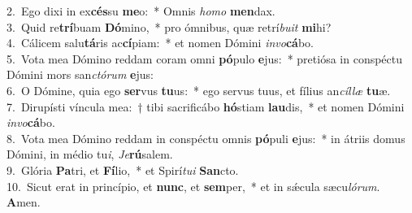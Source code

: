 {2.~}Ego dixi in ex\textbf{cés}su \textbf{me}o:~* Omnis \textit{ho}\textit{mo} \textbf{men}dax.\\
{3.~}Quid re\textbf{trí}buam \textbf{Dó}mino,~* pro ómnibus, quæ retrí\textit{bu}\textit{it} \textbf{mi}hi?\\
{4.~}Cálicem salu\textbf{tá}ris ac\textbf{cí}piam:~* et nomen Dómini \textit{in}\textit{vo}\textbf{cá}bo.\\
{5.~}Vota mea Dómino reddam coram omni \textbf{pó}pulo \textbf{e}jus:~* pretiósa in conspéctu Dómini mors san\textit{ctó}\textit{rum} \textbf{e}jus:\\
{6.~}O Dómine, quia ego \textbf{ser}vus \textbf{tu}us:~* ego servus tuus, et fílius an\textit{cíl}\textit{læ} \textbf{tu}æ.\\
{7.~}Dirupísti víncula mea:~† tibi sacrificábo \textbf{hó}stiam \textbf{lau}dis,~* et nomen Dómini \textit{in}\textit{vo}\textbf{cá}bo.\\
{8.~}Vota mea Dómino reddam in conspéctu omnis \textbf{pó}puli \textbf{e}jus:~* in átriis domus Dómini, in médio tu\textit{i}, \textit{Je}\textbf{rú}salem.\\
{9.~}Glória \textbf{Pa}tri, et \textbf{Fí}lio,~* et Spirí\textit{tu}\textit{i} \textbf{San}cto.\\
{10.~}Sicut erat in princípio, et \textbf{nunc}, et \textbf{sem}per,~* et in sǽcula sæcu\textit{ló}\textit{rum}. \textbf{A}men.\\
